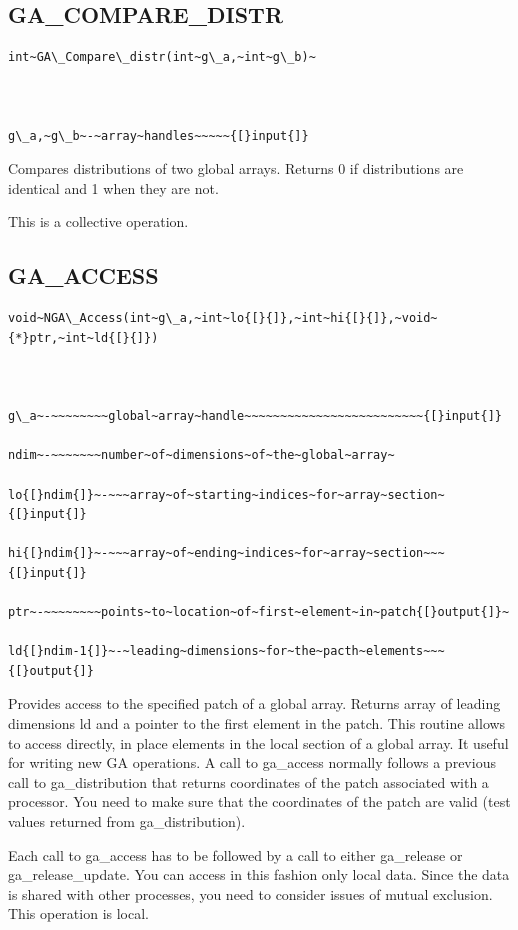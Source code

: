 \subsection*{\label{sub:GA_COMPARE_DISTR}GA\_COMPARE\_DISTR}
\begin{verbatim}
int~GA\_Compare\_distr(int~g\_a,~int~g\_b)~



g\_a,~g\_b~-~array~handles~~~~~{[}input{]}
\end{verbatim}
Compares distributions of two global arrays. Returns 0 if distributions
are identical and 1 when they are not.

This is a collective operation. 


\subsection*{\label{sub:GA_ACCESS}GA\_ACCESS}
\begin{verbatim}
void~NGA\_Access(int~g\_a,~int~lo{[}{]},~int~hi{[}{]},~void~{*}ptr,~int~ld{[}{]})



g\_a~-~~~~~~~~global~array~handle~~~~~~~~~~~~~~~~~~~~~~~~~{[}input{]}

ndim~-~~~~~~~number~of~dimensions~of~the~global~array~

lo{[}ndim{]}~-~~~array~of~starting~indices~for~array~section~{[}input{]}

hi{[}ndim{]}~-~~~array~of~ending~indices~for~array~section~~~{[}input{]}

ptr~-~~~~~~~~points~to~location~of~first~element~in~patch{[}output{]}~

ld{[}ndim-1{]}~-~leading~dimensions~for~the~pacth~elements~~~{[}output{]}
\end{verbatim}
Provides access to the specified patch of a global array. Returns
array of leading dimensions ld and a pointer to the first element
in the patch. This routine allows to access directly, in place elements
in the local section of a global array. It useful for writing new
GA operations. A call to ga\_access normally follows a previous call
to ga\_distribution that returns coordinates of the patch associated
with a processor. You need to make sure that the coordinates of the
patch are valid (test values returned from ga\_distribution).

Each call to ga\_access has to be followed by a call to either ga\_release
or ga\_release\_update. You can access in this fashion only local
data. Since the data is shared with other processes, you need to consider
issues of mutual exclusion. This operation is local. 


